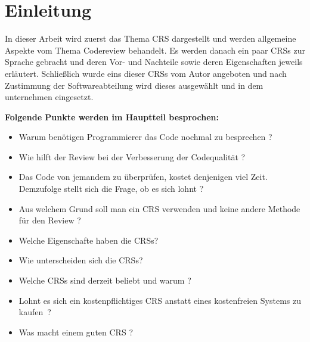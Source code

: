 \section{Einleitung}
\label{sec:Einleitung}

In dieser Arbeit wird zuerst das Thema \ac{CRS} dargestellt und werden allgemeine Aspekte vom Thema Codereview behandelt.
Es werden danach ein paar \acp{CRS} zur Sprache gebracht und deren Vor- und Nachteile sowie deren Eigenschaften jeweils erläutert.
Schließlich wurde eins dieser \acp{CRS} vom Autor angeboten und nach Zustimmung der Softwareabteilung wird dieses ausgewählt und in dem unternehmen eingesetzt.

\vspace{2cm}
\textbf{Folgende Punkte werden im Hauptteil besprochen:}

\begin{itemize}
\item Warum benötigen Programmierer das Code nochmal zu besprechen ?
\item Wie hilft der Review bei der Verbesserung der Codequalität ?
\item Das Code von jemandem zu überprüfen, kostet denjenigen viel Zeit. Demzufolge stellt sich die Frage, ob es sich lohnt ?
\item Aus welchem Grund soll man ein \ac{CRS} verwenden und keine andere Methode für den Review ?
\item Welche Eigenschafte haben die \acp{CRS}?
\item Wie unterscheiden sich die \acp{CRS}?
\item Welche \acp{CRS} sind derzeit beliebt und warum ?
\item Lohnt es sich ein kostenpflichtiges \ac{CRS} anstatt eines kostenfreien Systems zu kaufen~?
\item Was macht einem guten \ac{CRS} ?
\end{itemize}

\newpage
\listoftodos

